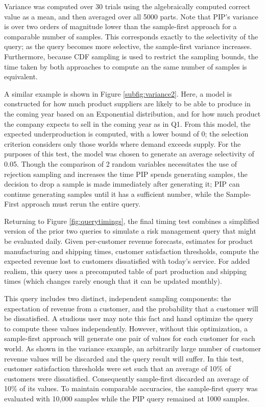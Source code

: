 Variance was computed over 30 trials using the algebraically computed correct value as a mean, and then averaged over all 5000 parts.  Note that PIP's variance is over two orders of magnitude lower than the sample-first approach for a comparable number of samples.  This corresponds exactly to the selectivity of the query; as the query becomes more selective, the sample-first variance increases.  Furthermore, because CDF sampling is used to restrict the sampling bounds, the time taken by both approaches to compute an the same number of samples is equivalent.

A similar example is shown in Figure \ref{subfig:variance2}.  Here, a model is constructed for how much product suppliers are likely to be able to produce in the coming year based on an Exponential distribution, and for how much product the company expects to sell in the coming year as in Q1.  From this model, the expected underproduction is computed, with a lower bound of 0; the selection criterion considers only those worlds where demand exceeds supply.  For the purposes of this test, the model was chosen to generate an average selectivity of 0.05.  Though the comparison of 2 random variables necessitates the use of rejection sampling and increases the time PIP spends generating samples, the decision to drop a sample is made immediately after generating it; PIP can continue generating samples until it has a sufficient number, while the Sample-First approach must rerun the entire query.

Returning to Figure \ref{fig:querytimings}, the final timing test combines a simplified version of the prior two queries to simulate a risk management query that might be evaluated daily.  Given per-customer revenue forecasts, estimates for product manufacturing and shipping times, customer satisfaction thresholds, compute the expected revenue lost to customers dissatisfied with today's service.  For added realism, this query uses a precomputed table of part production and shipping times (which changes rarely enough that it can be updated monthly).  %

This query includes two distinct, independent sampling components: the expectation of revenue from a customer, and the probability that a customer will be dissatisfied.  A studious user may note this fact and hand optimize the query to compute these values independently.  However, without this optimization, a sample-first approach will generate one pair of values for each customer for each world.  As shown in the variance example, an arbitrarily large number of customer revenue values will be discarded and the query result will suffer.  In this test, customer satisfaction thresholds were set such that an average of 10\% of customers were dissatisfied.  Consequently sample-first discarded an average of 10\% of its values.  To maintain comparable accuracies, the sample-first query was evaluated with 10,000 samples while the PIP query remained at 1000 samples. 

